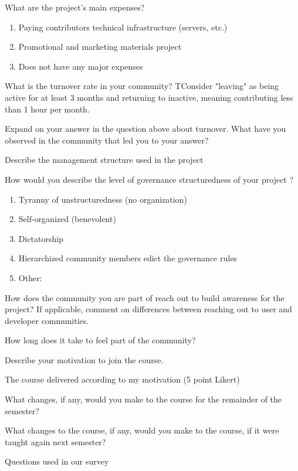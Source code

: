 \begin{table}
What are the project's main expenses?
\begin{enumerate}
\item Paying contributors technical infrastructure (servers, etc.)
\item Promotional and marketing materials project
\item Does not have any major expenses
\end{enumerate}

What is the turnover rate in your community? TConsider "leaving" as being active for at least 3 months and returning to inactive, meaning contributing less than 1 hour per month.

Expand on your answer in the question above about turnover. What have you observed in the community that led you to your answer?

Describe the management structure used in the project

How would you describe the level of governance structuredness of your project ?
\begin{enumerate}
\item Tyranny of unstructuredness (no organization)
\item Self-organized (benevolent)
\item Dictatorship
\item Hierarchized community members edict the governance rules
\item Other:
\end{enumerate}

How does the community you are part of reach out to build awareness for the project? If applicable, comment on differences between reaching out to user and developer communities.

How long does it take to feel part of the community?

Describe your motivation to join the course.

The course delivered according to my motivation (5 point Likert)

What changes, if any, would you make to the course for the remainder of the semester?

What changes to the course, if any, would you make to the course, if it were taught again next semester?

\caption{Questions used in our survey}
\label{tab:survey_question}
\end{table}